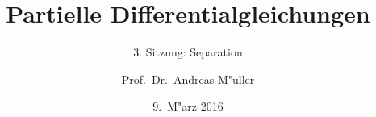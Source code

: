 \documentclass[handout]{beamer}
\title[]{Partielle Differentialgleichungen}
\subtitle{3. Sitzung: Separation}
\date[9.~M"arz 2016]{9.~M"arz 2016}
\author{Prof.~Dr.~Andreas M"uller}
\begin{document}
\begin{frame}
\titlepage

\end{frame}


\end{document}
